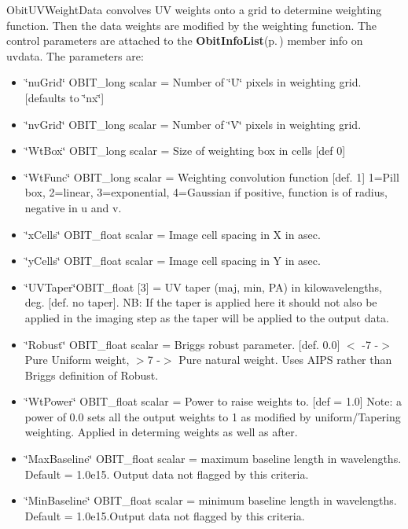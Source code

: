 Obit\-UVWeight\-Data convolves UV weights onto a grid to determine weighting function. Then the data weights are modified by the weighting function. The control parameters are attached to the {\bf Obit\-Info\-List}{\rm (p.\,\pageref{structObitInfoList})} member info on uvdata. The parameters are: \begin{itemize}
\item \char`\"{}nu\-Grid\char`\"{} OBIT\_\-long scalar = Number of \char`\"{}U\char`\"{} pixels in weighting grid. [defaults to \char`\"{}nx\char`\"{}] \item \char`\"{}nv\-Grid\char`\"{} OBIT\_\-long scalar = Number of \char`\"{}V\char`\"{} pixels in weighting grid. \item \char`\"{}Wt\-Box\char`\"{} OBIT\_\-long scalar = Size of weighting box in cells [def 0] \item \char`\"{}Wt\-Func\char`\"{} OBIT\_\-long scalar = Weighting convolution function [def. 1] 1=Pill box, 2=linear, 3=exponential, 4=Gaussian if positive, function is of radius, negative in u and v. \item \char`\"{}x\-Cells\char`\"{} OBIT\_\-float scalar = Image cell spacing in X in asec. \item \char`\"{}y\-Cells\char`\"{} OBIT\_\-float scalar = Image cell spacing in Y in asec. \item \char`\"{}UVTaper\char`\"{}OBIT\_\-float [3] = UV taper (maj, min, PA) in kilowavelengths, deg. [def. no taper]. NB: If the taper is applied here it should not also be applied in the imaging step as the taper will be applied to the output data. \item \char`\"{}Robust\char`\"{} OBIT\_\-float scalar = Briggs robust parameter. [def. 0.0] $<$ -7 -$>$ Pure Uniform weight, $>$7 -$>$ Pure natural weight. Uses AIPS rather than Briggs definition of Robust. \item \char`\"{}Wt\-Power\char`\"{} OBIT\_\-float scalar = Power to raise weights to. [def = 1.0] Note: a power of 0.0 sets all the output weights to 1 as modified by uniform/Tapering weighting. Applied in determing weights as well as after. \item \char`\"{}Max\-Baseline\char`\"{} OBIT\_\-float scalar = maximum baseline length in wavelengths. Default = 1.0e15. Output data not flagged by this criteria. \item \char`\"{}Min\-Baseline\char`\"{} OBIT\_\-float scalar = minimum baseline length in wavelengths. Default = 1.0e15.Output data not flagged by this criteria.\end{itemize}


